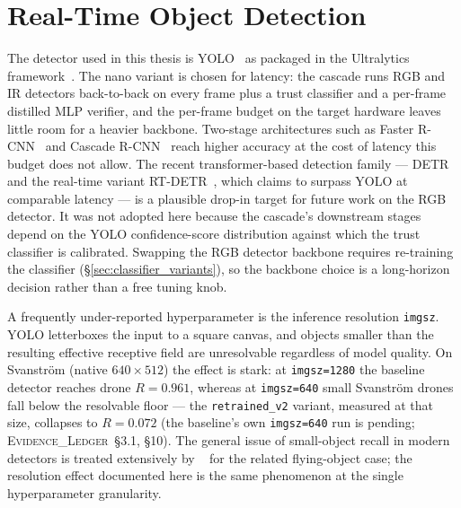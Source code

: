 \documentclass[12pt,a4paper,oneside,openright]{book}
\begin{document}
\section{Real-Time Object Detection}
\label{sec:lit_objdet}

The detector used in this thesis is YOLO~\cite{redmon2016yolo} as packaged in the Ultralytics framework~\cite{ultralytics2024}. The nano variant is chosen for latency: the cascade runs RGB and IR detectors back-to-back on every frame plus a trust classifier and a per-frame distilled MLP verifier, and the per-frame budget on the target hardware leaves little room for a heavier backbone. Two-stage architectures such as Faster R-CNN~\cite{ren2015fasterrcnn} and Cascade R-CNN~\cite{cai2018cascade} reach higher accuracy at the cost of latency this budget does not allow. The recent transformer-based detection family --- DETR~\cite{carion2020detr} and the real-time variant RT-DETR~\cite{zhao2024rtdetr}, which claims to surpass YOLO at comparable latency --- is a plausible drop-in target for future work on the RGB detector. It was not adopted here because the cascade's downstream stages depend on the YOLO confidence-score distribution against which the trust classifier is calibrated. Swapping the RGB detector backbone requires re-training the classifier (\S\ref{sec:classifier_variants}), so the backbone choice is a long-horizon decision rather than a free tuning knob.

A frequently under-reported hyperparameter is the inference resolution \texttt{imgsz}. YOLO letterboxes the input to a square canvas, and objects smaller than the resulting effective receptive field are unresolvable regardless of model quality. On Svanstr\"om (native $640\times512$) the effect is stark: at \texttt{imgsz=1280} the baseline detector reaches drone $R=0.961$, whereas at \texttt{imgsz=640} small Svanstr\"om drones fall below the resolvable floor --- the \texttt{retrained\_v2} variant, measured at that size, collapses to $R=0.072$ (the baseline's own \texttt{imgsz=640} run is pending; \textsc{Evidence\_Ledger}~\S3.1, \S10). The general issue of small-object recall in modern detectors is treated extensively by \citeauthor{rozantsev2017detecting}~\cite{rozantsev2017detecting} for the related flying-object case; the resolution effect documented here is the same phenomenon at the single hyperparameter granularity.
\end{document}
